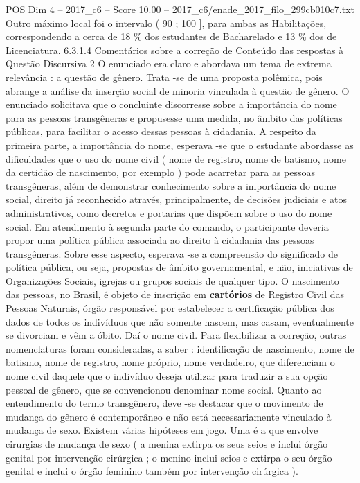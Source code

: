 \begin{textsample}{POS Dim 4 – 2017\_c6 – Score 10.00 – 2017\_c6/enade\_2017\_filo\_299cb010c7.txt}
Outro máximo local foi o intervalo ( 90 ; 100 ], para ambas as Habilitações, correspondendo a cerca de 18 \% dos estudantes de Bacharelado e 13 \% dos de Licenciatura. 6.3.1.4 Comentários sobre a correção de Conteúdo das respostas à Questão Discursiva 2 O enunciado era claro e abordava um tema de extrema relevância : a questão de gênero.
Trata -se de uma proposta polêmica, pois abrange a análise da inserção social de minoria vinculada à questão de gênero.
O enunciado solicitava que o concluinte discorresse sobre a importância do nome para as pessoas transgêneras e propusesse uma medida, no âmbito das políticas públicas, para facilitar o acesso dessas pessoas à cidadania.
A respeito da primeira parte, a importância do nome, esperava -se que o estudante abordasse as dificuldades que o uso do nome civil ( nome de registro, nome de batismo, nome da certidão de nascimento, por exemplo ) pode acarretar para as pessoas transgêneras, além de demonstrar conhecimento sobre a importância do nome social, direito já reconhecido através, principalmente, de decisões judiciais e atos administrativos, como decretos e portarias que dispõem sobre o uso do nome social.
Em atendimento à segunda parte do comando, o participante deveria propor uma política pública associada ao direito à cidadania das pessoas transgêneras.
Sobre esse aspecto, esperava -se a compreensão do significado de política pública, ou seja, propostas de âmbito governamental, e não, iniciativas de Organizações Sociais, igrejas ou grupos sociais de qualquer tipo.
O nascimento das pessoas, no Brasil, é objeto de inscrição em \textbf{cartórios} de Registro Civil das Pessoas Naturais, órgão responsável por estabelecer a certificação pública dos dados de todos os indivíduos que não somente nascem, mas casam, eventualmente se divorciam e vêm a óbito.
Daí o nome civil.
Para flexibilizar a correção, outras nomenclaturas foram consideradas, a saber : identificação de nascimento, nome de batismo, nome de registro, nome próprio, nome verdadeiro, que diferenciam o nome civil daquele que o indivíduo deseja utilizar para traduzir a sua opção pessoal de gênero, que se convencionou denominar nome social.
Quanto ao entendimento do termo transgênero, deve -se destacar que o movimento de mudança do gênero é contemporâneo e não está necessariamente vinculado à mudança de sexo.
Existem várias hipóteses em jogo.
Uma é a que envolve cirurgias de mudança de sexo ( a menina extirpa os seus seios e inclui órgão genital por intervenção cirúrgica ; o menino inclui seios e extirpa o seu órgão genital e inclui o órgão feminino também por intervenção cirúrgica ).

\end{textsample}
